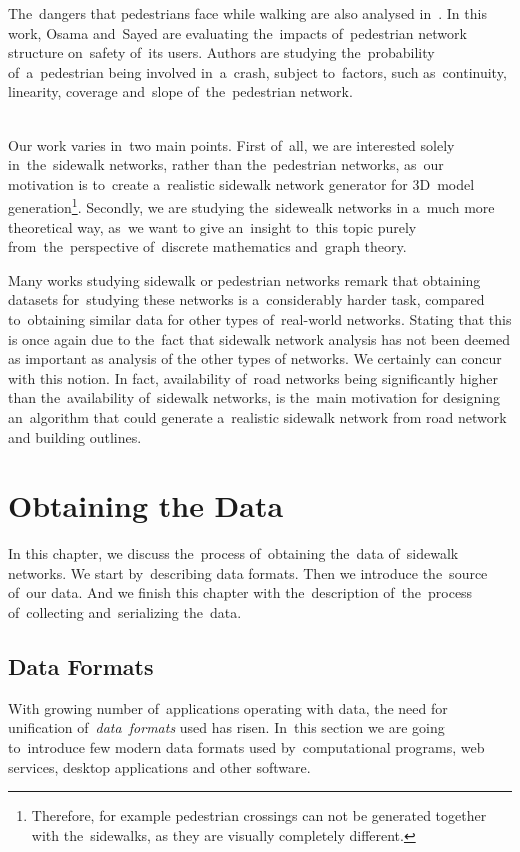 The~dangers that pedestrians face while walking are also analysed in~\cite{Osama}. In this work, Osama and~Sayed are evaluating the~impacts of~pedestrian network structure on~safety of~its users. Authors are studying the~probability of~a~pedestrian being involved in~a~crash, subject to~factors, such as~continuity, linearity, coverage and~slope of~the~pedestrian network. \\
\\
\begin{samepage}
Our work varies in~two main points. First of~all, we are interested solely in~the~sidewalk networks, rather than the~pedestrian networks, as~our motivation is to~create a~realistic sidewalk network generator for 3D~model generation\footnote{Therefore, for example pedestrian crossings can not be generated together with the~sidewalks, as they are visually completely different.}. Secondly, we are studying the~sidewealk networks in a~much more theoretical way, as~we want to give an~insight to~this topic purely from~the~perspective of~discrete mathematics and~graph theory. \\
\end{samepage}
Many works studying sidewalk or pedestrian networks remark that obtaining datasets for~studying these networks is a~considerably harder task, compared to~obtaining similar data for other types of~real-world networks. Stating that this is once again due to the~fact that sidewalk network analysis has not been deemed as important as analysis of the other types of networks. We certainly can concur with this notion. In fact, availability of~road networks being significantly higher than the~availability of~sidewalk networks, is the~main motivation for designing an~algorithm that could generate a~realistic sidewalk network from road network and building outlines.
\chapter{Obtaining the Data}
In this chapter, we discuss the~process of~obtaining the~data of~sidewalk networks. We start by~describing data formats. Then we introduce the~source of~our data. And we finish this chapter with the~description of~the~process of~collecting and~serializing the~data.
\section{Data Formats}
With growing number of~applications operating with data, the need for unification of~\textit{data~formats} used has risen. In~this section we are going to~introduce few modern data formats used by~computational programs, web services, desktop applications and other software.
